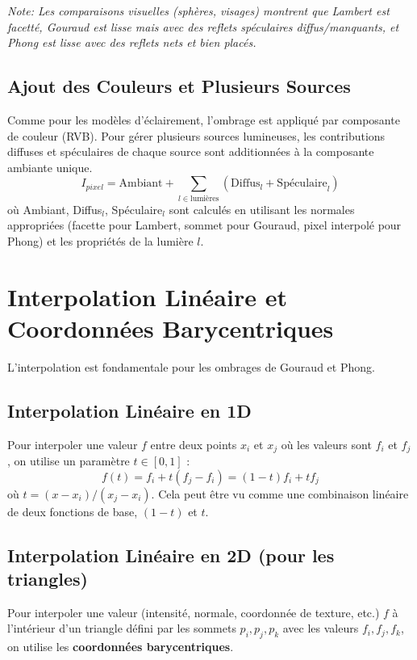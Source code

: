 \documentclass{article}
\begin{document}
\textit{Note: Les comparaisons visuelles (sphères, visages) montrent que Lambert est facetté, Gouraud est lisse mais avec des reflets spéculaires diffus/manquants, et Phong est lisse avec des reflets nets et bien placés.}

\subsection{Ajout des Couleurs et Plusieurs Sources}
Comme pour les modèles d'éclairement, l'ombrage est appliqué par composante de couleur (RVB). Pour gérer plusieurs sources lumineuses, les contributions diffuses et spéculaires de chaque source sont additionnées à la composante ambiante unique.
\[ I_{pixel} = \text{Ambiant} + \sum_{l \in \text{lumières}} (\text{Diffus}_l + \text{Spéculaire}_l) \]
où Ambiant, Diffus$_l$, Spéculaire$_l$ sont calculés en utilisant les normales appropriées (facette pour Lambert, sommet pour Gouraud, pixel interpolé pour Phong) et les propriétés de la lumière $l$.

\section{Interpolation Linéaire et Coordonnées Barycentriques}

L'interpolation est fondamentale pour les ombrages de Gouraud et Phong.

\subsection{Interpolation Linéaire en 1D}
Pour interpoler une valeur $f$ entre deux points $x_i$ et $x_j$ où les valeurs sont $f_i$ et $f_j$, on utilise un paramètre $t \in [0,1]$ :
\[ f(t) = f_i + t(f_j - f_i) = (1-t)f_i + tf_j \]
où $t = (x - x_i) / (x_j - x_i)$.
Cela peut être vu comme une combinaison linéaire de deux fonctions de base, $(1-t)$ et $t$.

\subsection{Interpolation Linéaire en 2D (pour les triangles)}
Pour interpoler une valeur (intensité, normale, coordonnée de texture, etc.) $f$ à l'intérieur d'un triangle défini par les sommets $p_i, p_j, p_k$ avec les valeurs $f_i, f_j, f_k$, on utilise les \textbf{coordonnées barycentriques}.
\end{document}
